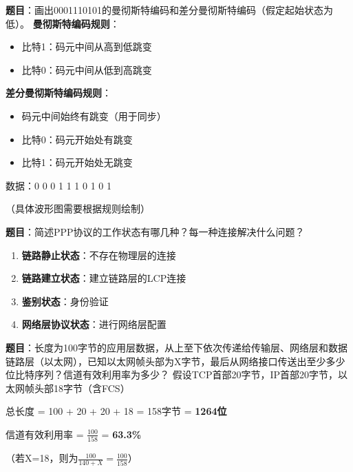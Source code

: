 \begin{examplebox}
\textbf{题目}：画出0001110101的曼彻斯特编码和差分曼彻斯特编码（假定起始状态为低）。
\tcblower
\textbf{曼彻斯特编码规则}：
\begin{itemize}[itemsep=0pt]
    \item 比特1：码元中间从高到低跳变
    \item 比特0：码元中间从低到高跳变
\end{itemize}

\textbf{差分曼彻斯特编码规则}：
\begin{itemize}[itemsep=0pt]
    \item 码元中间始终有跳变（用于同步）
    \item 比特0：码元开始处有跳变
    \item 比特1：码元开始处无跳变
\end{itemize}

数据：0 0 0 1 1 1 0 1 0 1

（具体波形图需要根据规则绘制）
\end{examplebox}

\begin{examplebox}
\textbf{题目}：简述PPP协议的工作状态有哪几种？每一种连接解决什么问题？
\tcblower
\begin{enumerate}[itemsep=0pt]
    \item \textbf{链路静止状态}：不存在物理层的连接
    \item \textbf{链路建立状态}：建立链路层的LCP连接
    \item \textbf{鉴别状态}：身份验证
    \item \textbf{网络层协议状态}：进行网络层配置
\end{enumerate}
\end{examplebox}

\begin{examplebox}
\textbf{题目}：长度为100字节的应用层数据，从上至下依次传递给传输层、网络层和数据链路层（以太网），已知以太网帧头部为X字节，最后从网络接口传送出至少多少位比特序列？信道有效利用率为多少？
\tcblower
假设TCP首部20字节，IP首部20字节，以太网帧头部18字节（含FCS）

总长度 = 100 + 20 + 20 + 18 = 158字节 = \textbf{1264位}

信道有效利用率 = $\frac{100}{158}$ = \textbf{63.3\%}

（若X=18，则为$\frac{100}{140+X} = \frac{100}{158}$）
\end{examplebox}

